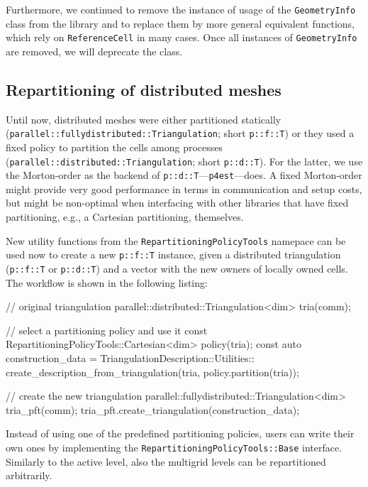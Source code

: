\documentclass{ansarticle-preprint}
\begin{document}
Furthermore, we continued to remove the instance of usage of the \texttt{GeometryInfo} class from
the library and to replace them by more general equivalent functions, which
rely on \texttt{ReferenceCell} in many cases. Once all instances of 
\texttt{GeometryInfo} are removed, we will deprecate the class.

\subsection{Repartitioning of distributed meshes}\label{sec:repartitioning}

Until now, distributed meshes were either partitioned statically (\texttt{parallel::\allowbreak fullydistributed::\allowbreak Triangulation}; short \texttt{p::f::T}) or they used a
fixed policy to partition the cells among processes
(\texttt{parallel::\allowbreak distributed::\allowbreak Triangulation}; short \texttt{p::d::T}). For the latter, we
use the Morton-order as the backend of \texttt{p::d::T}---\texttt{p4est}---does. A fixed Morton-order
might provide very good performance in terms in communication and
setup costs, but might be non-optimal when interfacing with other
libraries that have fixed partitioning, e.g., a Cartesian
partitioning, themselves.

New utility functions from the \texttt{RepartitioningPolicyTools} namepace can be
used now to create a new \texttt{p::f::T} instance,
given a distributed triangulation (\texttt{p::f::T} or \texttt{p::d::T}) and a vector with the new owners of locally
owned cells. The workflow is shown in the following listing:
\begin{c++}
// original triangulation
parallel::distributed::Triangulation<dim> tria(comm);

// select a partitioning policy and use it
const RepartitioningPolicyTools::Cartesian<dim> policy(tria);
const auto construction_data = TriangulationDescription::Utilities::
  create_description_from_triangulation(tria, policy.partition(tria));

// create the new triangulation
parallel::fullydistributed::Triangulation<dim> tria_pft(comm);
tria_pft.create_triangulation(construction_data);
\end{c++}
Instead of using one of the predefined partitioning policies, users
can write their own ones by implementing the \texttt{RepartitioningPolicyTools::Base} interface. Similarly to the
active level, also the multigrid levels can be repartitioned arbitrarily.
\end{document}

